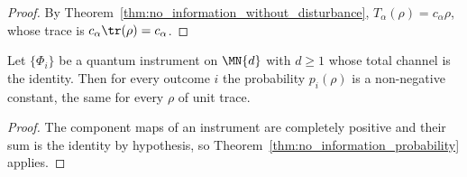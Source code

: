 \begin{proof}
    \leanok
    By Theorem~\ref{thm:no_information_without_disturbance},
    $T_\alpha(\rho)=c_\alpha\rho$, whose trace is $c_\alpha\tr(\rho)=c_\alpha$.
\end{proof}

\begin{corollary}
    \label{cor:no_information_instrument}
    \leanok
    Let $\{\Phi_i\}$ be a quantum instrument on $\MN{d}$ with $d\geq1$ whose
    total channel is the identity. Then for every outcome $i$ the probability
    $p_i(\rho)$ is a non-negative constant, the same for every $\rho$ of unit
    trace.
\end{corollary}

\begin{proof}
    \leanok
    The component maps of an instrument are completely positive and their sum
    is the identity by hypothesis, so
    Theorem~\ref{thm:no_information_probability} applies.
\end{proof}

